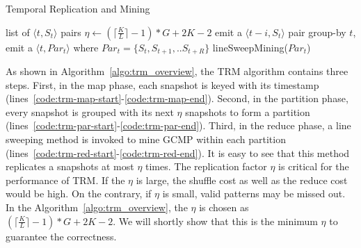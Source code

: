 \begin{algorithm}
\caption{Temporal Replication and Mining}
\label{algo:trm_overview}
\begin{algorithmic}[1]
\Require list of $\langle t, S_t \rangle$ pairs
\State $\eta \gets (\lceil \frac{K}{L} \rceil -1)*G+2K-2$
\label{code:trm-map-start}
		\State emit a $\langle t-i, S_t \rangle$ pair
	\EndFor  
\EndFor
\label{code:trm-map-end}
\label{code:trm-par-start}
\State group-by $t$, emit a $\langle t, Par_t\rangle$
\State where $Par_t = \{S_t, S_{t+1}, .. S_{t+R}\} $
\EndFor
\label{code:trm-par-end}
\label{code:trm-red-start}
\State lineSweepMining($Par_t$)
\label{code:trm-red-end}
\EndFor
\end{algorithmic}
\end{algorithm}

As shown in Algorithm~\ref{algo:trm_overview}, the TRM algorithm contains
three steps. First, in the map phase, each snapshot is keyed 
with its timestamp (lines~\ref{code:trm-map-start}-\ref{code:trm-map-end}). 
Second, in the partition phase, every snapshot is grouped with its next 
$\eta$ snapshots to form a partition (lines~\ref{code:trm-par-start}-\ref{code:trm-par-end}). 
Third, in the reduce phase, a line sweeping method is invoked 
to mine GCMP within each partition (lines~\ref{code:trm-red-start}-\ref{code:trm-red-end}). 
It is easy to see that this method replicates a snapshots at most $\eta$ times.
The replication factor $\eta$ is critical for the performance of TRM.
If the $\eta$ is large, the shuffle cost as well as the reduce cost would be high. 
On the contrary, if $\eta$ is small, valid patterns may
be missed out. In the Algorithm~\ref{algo:trm_overview}, the 
$\eta$ is chosen as $(\lceil \frac{K}{L} \rceil -1)*G+2K-2$. We will shortly show that this is the minimum $\eta$ to guarantee the correctness.

